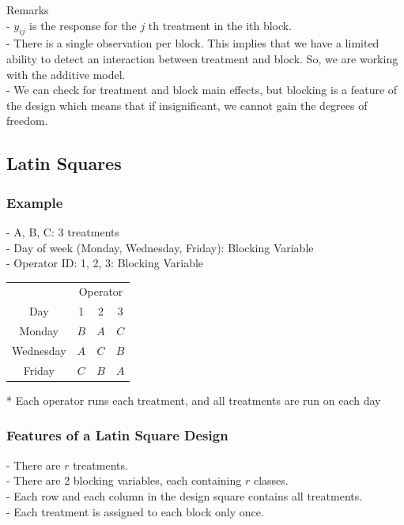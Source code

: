 \documentclass[11pt,a4paper]{article}
\begin{document}
Remarks\\
- $y_{i j}$ is the response for the $j$ th treatment in the ith block.\\
- There is a single observation per block. This implies that we have a limited ability to detect an interaction between treatment and block. So, we are working with the additive model.\\
- We can check for treatment and block main effects, but blocking is a feature of the design which means that if insignificant, we cannot gain the degrees of freedom.\\

\subsection{ Latin Squares}

\subsubsection{Example}
- A, B, C: 3 treatments\\
- Day of week (Monday, Wednesday, Friday): Blocking Variable\\
- Operator ID: 1, 2, 3: Blocking Variable\\
\begin{center}
\begin{tabular}{cccc}
& \multicolumn{3}{c}{ Operator } \\
Day & 1 & 2 & 3 \\
\hline Monday & $B$ & $A$ & $C$ \\
Wednesday & $A$ & $C$ & $B$ \\
Friday & $C$ & $B$ & $A$ \\
\hline
\end{tabular}
\end{center}
* Each operator runs each treatment, and all treatments are run on each day


\subsubsection{ Features of a Latin Square Design}
- There are $r$ treatments.\\
- There are 2 blocking variables, each containing $r$ classes.\\
- Each row and each column in the design square contains all treatments.\\
- Each treatment is assigned to each block only once.\\
\end{document}
